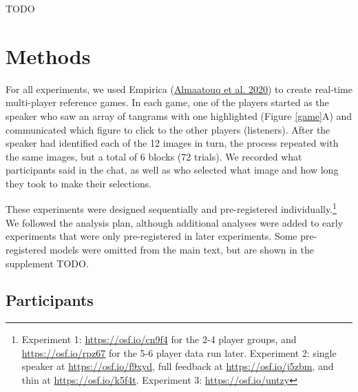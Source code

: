 \documentclass[
  english,
  a4paper,
]{article}
\begin{document}
TODO

\hypertarget{methods}{%
\section{Methods}\label{methods}}

For all experiments, we used Empirica (\protect\hyperlink{ref-almaatouqEmpiricaVirtualLab2020}{Almaatouq et al. 2020}) to create real-time multi-player reference games. In each game, one of the players started as the speaker who saw an array of tangrams with one highlighted (Figure \ref{game}A) and communicated which figure to click to the other players (listeners). After the speaker had identified each of the 12 images in turn, the process repeated with the same images, but a total of 6 blocks (72 trials). We recorded what participants said in the chat, as well as who selected what image and how long they took to make their selections.

These experiments were designed sequentially and pre-registered individually.\footnote{Experiment 1: \url{https://osf.io/cn9f4} for the 2-4 player groups, and \url{https://osf.io/rpz67} for the 5-6 player data run later. Experiment 2: single speaker at \url{https://osf.io/f9xyd}, full feedback at \url{https://osf.io/j5zbm}, and thin at \url{https://osf.io/k5f4t}. Experiment 3: \url{https://osf.io/untzy}} We followed the analysis plan, although additional analyses were added to early experiments that were only pre-registered in later experiments. Some pre-registered models were omitted from the main text, but are shown in the supplement TODO.

\hypertarget{participants}{%
\subsection{Participants}\label{participants}}
\end{document}
